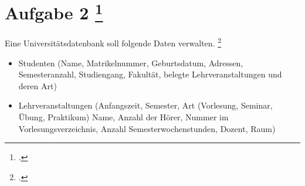 \documentclass{bschlangaul-aufgabe}
\begin{document}

\section{Aufgabe 2
\footcite[Aufgabe 2]{examen:66111:1996:03}}

Eine Universitätsdatenbank soll folgende Daten verwalten.
\footcite[Seite 219-221]{bloechl}

\begin{itemize}
\item Studenten (Name, Matrikelnummer, Geburtsdatum, Adressen,
Semesteranzahl, Studiengang, Fakultät, belegte Lehrveranstaltungen und
deren Art)

\item Lehrveranstaltungen (Anfangszeit, Semester, Art (Vorlesung,
Seminar, Übung, Praktikum) Name, Anzahl der Hörer, Nummer im
Vorlesungsverzeichnis, Anzahl Semesterwochenstunden, Dozent, Raum)
\end{itemize}
\end{document}
